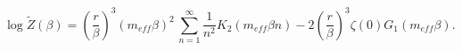 \begin{equation}
\log \widetilde{Z}\left(\beta \right)=\left(\frac{r}{\beta }\right)^{3}\left(m_{eff}\beta \right)^{2}\, \sum _{n=1}^{\infty }\frac{1}{n^{2}}K_{2}\left(m_{eff}\beta n\right)-2\left(\frac{r}{\beta }\right)^{3}\zeta \left(0\right)G_{1}\left(m_{eff}\beta \right).\label{thermal partition function}\end{equation}

